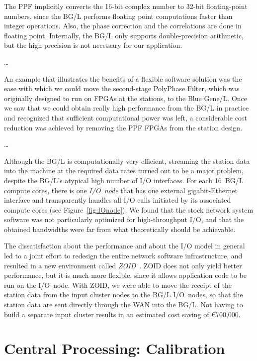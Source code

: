 \documentclass[journal]{IEEEtran}
\begin{document}


The PPF implicitly converts the 16-bit complex number to 32-bit floating-point
numbers, since the BG/L performs floating point computations faster than
integer operations.
Also, the phase correction and the correlations are done in floating point.
Internally, the BG/L only supports double-precision arithmetic, but the
high precision is not necessary for our application.



\ldots

An example that illustrates the benefits of a flexible software solution was
the ease with which we could move the second-stage PolyPhase Filter, which was
originally designed to run on FPGAs at the stations, to the Blue Gene/L.
Once we saw that we could obtain really high performance from the BG/L in
practice and recognized that sufficient computational power was left,
a considerable cost reduction was achieved by removing the PPF FPGAs from the
station design.

\ldots

Although the BG/L is computationally very efficient,
streaming the station data into the machine at the required data rates
turned out to be a major problem,
despite the BG/L's atypical high number of I/O interfaces.
For each 16~BG/L compute cores, there is one {\em I/O~node\/} that
has one external gigabit-Ethernet interface and transparently handles all I/O
calls initiated by its associated compute cores (see Figure~\ref{fig:IOnode}).
We found that the stock network system software was not particularly optimized
for high-throughput I/O, and that the obtained bandwidths were far from what
theoretically should be achievable.

The dissatisfaction about the performance and about the I/O model in general
led to a joint effort to redesign the entire network software infrastructure,
and resulted in a new environment called {\em ZOID\/}~\cite{Iskra:08}.
ZOID does not only yield better performance, but it is much more flexible,
since it allows application code to be run on the I/O~node.
With ZOID, we were able to move the receipt of the station data from the input
cluster nodes to the BG/L I/O~nodes, so that the station data are sent
directly through the WAN into the BG/L.
Not having to build a separate input cluster results in an estimated cost
saving of \euro700,000.

\section{Central Processing: Calibration}
\end{document}
